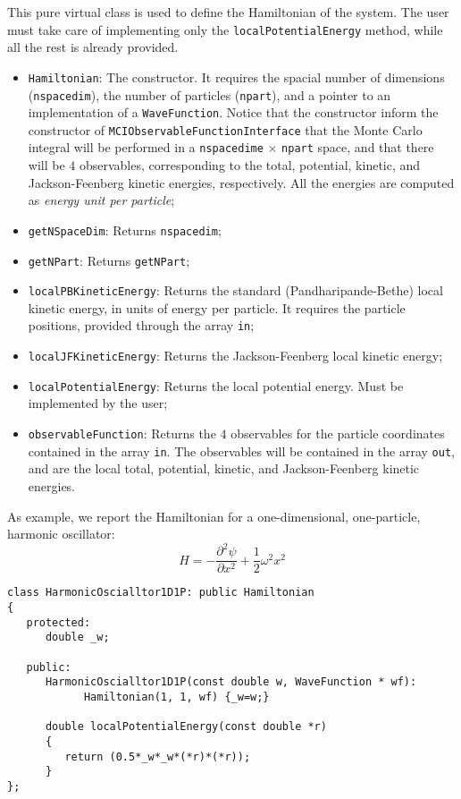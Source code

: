 \documentclass[11pt,a4paper,twoside]{article}
\begin{document}
This pure virtual class is used to define the Hamiltonian of the system.
The user must take care of implementing only the \verb+localPotentialEnergy+ method, while all the rest is already provided.

\begin{itemize}
\item \verb+Hamiltonian+: The constructor. It requires the spacial number of dimensions (\verb+nspacedim+), the number of particles (\verb+npart+), and a pointer to an implementation of a \verb+WaveFunction+. Notice that the constructor inform the constructor of \verb+MCIObservableFunctionInterface+ that the Monte Carlo integral will be performed in a \verb+nspacedime+ $\times$ \verb+npart+ space, and that there will be $4$ observables, corresponding to the total, potential, kinetic, and Jackson-Feenberg kinetic energies, respectively. All the energies are computed as \emph{energy unit per particle};
\item \verb+getNSpaceDim+: Returns \verb+nspacedim+;
\item \verb+getNPart+: Returns \verb+getNPart+;
\item \verb+localPBKineticEnergy+: Returns the standard (Pandharipande-Bethe) local kinetic energy, in units of energy per particle. It requires the particle positions, provided through the array \verb+in+;
\item \verb+localJFKineticEnergy+: Returns the Jackson-Feenberg local kinetic energy;
\item \verb+localPotentialEnergy+: Returns the local potential energy. Must be implemented by the user;
\item \verb+observableFunction+: Returns the $4$ observables for the particle coordinates contained in the array \verb+in+. The observables will be contained in the array \verb+out+, and are the local total, potential, kinetic, and Jackson-Feenberg kinetic energies.
\end{itemize}

As example, we report the Hamiltonian for a one-dimensional, one-particle, harmonic oscillator:
\begin{equation}
  H = - \frac{\partial^2 \psi}{\partial x^2} + \frac{1}{2} \omega^2 x^2
\end{equation}

\begin{lstlisting}
class HarmonicOscialltor1D1P: public Hamiltonian
{
   protected:
      double _w;

   public:
      HarmonicOscialltor1D1P(const double w, WaveFunction * wf):
            Hamiltonian(1, 1, wf) {_w=w;}

      double localPotentialEnergy(const double *r)
      {
         return (0.5*_w*_w*(*r)*(*r));
      }
};
\end{lstlisting}
\end{document}
